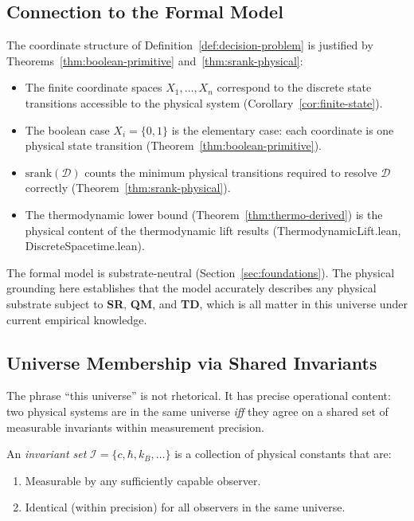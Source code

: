 \subsection{Connection to the Formal Model}\label{sec:physical-to-formal}

The coordinate structure of Definition~\ref{def:decision-problem} is justified
by Theorems~\ref{thm:boolean-primitive} and~\ref{thm:srank-physical}:

\begin{itemize}
\item The finite coordinate spaces $X_1, \ldots, X_n$ correspond to the
  discrete state transitions accessible to the physical system
  (Corollary~\ref{cor:finite-state}).

\item The boolean case $X_i = \{0,1\}$ is the elementary case:
  each coordinate is one physical state transition
  (Theorem~\ref{thm:boolean-primitive}).

\item $\mathrm{srank}(\mathcal{D})$ counts the minimum physical transitions
  required to resolve $\mathcal{D}$ correctly
  (Theorem~\ref{thm:srank-physical}).

\item The thermodynamic lower bound (Theorem~\ref{thm:thermo-derived})
  is the physical content of the thermodynamic lift results
  (ThermodynamicLift.lean, DiscreteSpacetime.lean).
\end{itemize}

The formal model is substrate-neutral (Section~\ref{sec:foundations}).
The physical grounding here establishes that the model accurately describes
any physical substrate subject to \textbf{SR}, \textbf{QM}, and \textbf{TD},
which is all matter in this universe under current empirical knowledge.

\subsection{Universe Membership via Shared Invariants}\label{sec:universe-membership}

The phrase ``this universe'' is not rhetorical. It has precise operational content:
two physical systems are in the same universe \emph{iff} they agree on a shared
set of measurable invariants within measurement precision.

\begin{definition}\label{def:invariant-set}
An \emph{invariant set} $\mathcal{I} = \{c, \hbar, k_B, \ldots\}$ is a collection
of physical constants that are:
\begin{enumerate}
\item Measurable by any sufficiently capable observer.
\item Identical (within precision) for all observers in the same universe.
\end{enumerate}
\end{definition}

